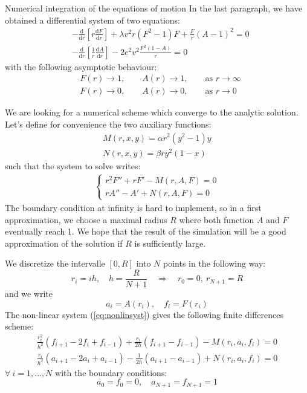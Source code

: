 \begin{subsection}{Numerical integration of the equations of motion}\label{subsec:integration}
  In the last paragraph, we have obtained a differential system of two
  equations:
  \begin{align}
    &-\frac{\mathrm d}{\mathrm d r}\left[r\frac{\mathrm d F}{\mathrm dr}\right]+\lambda v^2 r (F^2-1)F+ \frac{F}{r}(A-1)^2 = 0\\
    &-\frac{\mathrm d}{\mathrm d r}\left[\frac{1}{r}\frac{\mathrm d A}{\mathrm d r}\right] - 2e^2v^2\frac{F^2(1-A)}{r} = 0
  \end{align}
  with the following asymptotic behaviour:
  \begin{align}
    &F(r) \to 1,\qquad A(r) \to 1,\qquad \text{as }r\to \infty\\
    &F(r) \to 0,\qquad A(r) \to 0,\qquad \text{as }r\to 0
  \end{align}

  We are looking for a numerical scheme which converge to the analytic
  solution. Let's define for convenience the two auxiliary functions:
  \begin{align}
    M(r,x,y) = \alpha r^2(y^2-1)y\\
    N(r,x,y) = \beta ry^2(1-x)
  \end{align}
  such that the system to solve writes:
  \begin{align}
    \left\{\begin{aligned}
      r^2F''+rF'-M(r,A,F) = 0\\
      rA''-A'+N(r,A,F) = 0
    \end{aligned}\right.\label{eq:nonlinsyst}
  \end{align}
  The boundary condition at infinity is hard to implement, so in a
  first approximation, we choose a maximal radius $R$ where both
  function $A$ and $F$ eventually reach 1. We hope that the result of
  the simulation will be a good approximation of the solution if $R$
  is sufficiently large.

  We discretize the intervalle $[0,R]$ into $N$ points in the
  following way:
  \begin{equation}
    r_i = ih,\quad h = \frac{R}{N+1} \quad\Longrightarrow\quad r_0 = 0,\ r_{N+1} = R
  \end{equation}
  and we write
  \begin{equation}
    a_i = A(r_i),\quad f_i = F(r_i)
  \end{equation}
  The non-linear system (\ref{eq:nonlinsyst}) gives the following
  finite differences scheme:
  \begin{align}
    \frac{r_i^2}{h^2}\left(f_{i+1}-2f_i+f_{i-1}\right)+\frac{r_i}{2h}\left(f_{i+1}-f_{i-1}\right) - M(r_i, a_i, f_i) = 0\\
    \frac{r_i}{h^2}\left(a_{i+1}-2a_i+a_{i-1}\right)-\frac{1}{2h}\left(a_{i+1}-a_{i-1}\right) + N(r_i, a_i, f_i) = 0
  \end{align}
  $\forall\ i = 1,\dots,N$ with the boundary conditions:
  \begin{equation}
    a_0 = f_0 = 0,\quad a_{N+1} = f_{N+1} = 1
  \end{equation}


\end{subsection}
